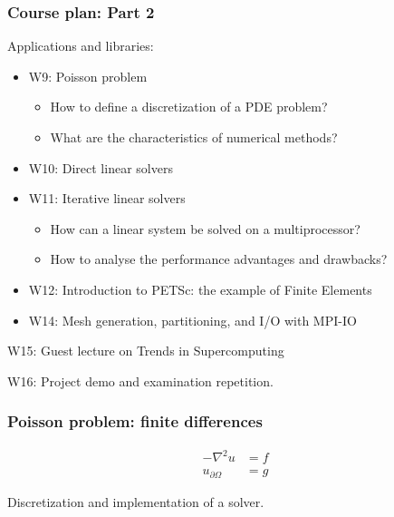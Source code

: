 \begin{frame}
  \frametitle{Course plan: Part 2}

Applications and libraries:
\begin{itemize}
\item W9: Poisson problem
\begin{itemize}
\item How to define a discretization of a PDE problem?
\item What are the characteristics of numerical methods?
\end{itemize}
\smallskip
\item W10: Direct linear solvers
\item W11: Iterative linear solvers
\begin{itemize}
\item How can a linear system be solved on a multiprocessor?
\item How to analyse the performance advantages and drawbacks?
\end{itemize}
\item W12: Introduction to PETSc: the example of Finite Elements
\item W14: Mesh generation, partitioning, and I/O with MPI-IO
\end{itemize}

\medskip

W15: Guest lecture on Trends in Supercomputing

\medskip
W16: Project demo and examination repetition.

\end{frame}


\begin{frame}
  \frametitle{Poisson problem: finite differences}
  \[
    \begin{split}
      -\nabla^2 u &= f \\
      u_{\partial\Omega} &= g
    \end{split}
  \]
  \begin{center}
    \scalebox{0.8}{
      
    }
  \end{center}

Discretization and implementation of a solver.
\end{frame}

